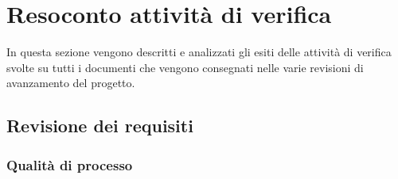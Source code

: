 \section{Resoconto attività di verifica}
In questa sezione vengono descritti e analizzati gli esiti delle attività
di verifica svolte su tutti i documenti che vengono consegnati nelle varie 
revisioni di avanzamento del progetto.

\subsection{Revisione dei requisiti}


\subsubsection{Qualità di processo}

